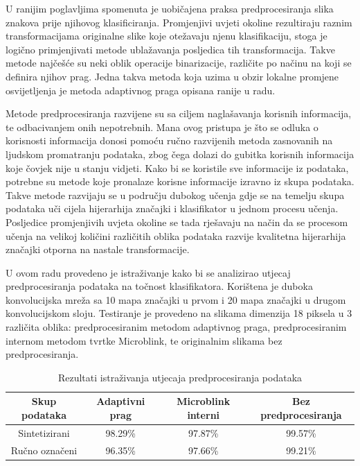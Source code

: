 \documentclass[lmodern, utf8, diplomski, numeric]{fer}
\begin{document}
U ranijim poglavljima spomenuta je uobičajena praksa predprocesiranja slika znakova prije njihovog klasificiranja. Promjenjivi uvjeti okoline rezultiraju raznim transformacijama originalne slike koje otežavaju njenu klasifikaciju, stoga je logično primjenjivati metode ublažavanja posljedica tih transformacija. Takve metode najčešće su neki oblik operacije binarizacije, različite po načinu na koji se definira njihov prag. Jedna takva metoda koja uzima u obzir lokalne promjene osvijetljenja je metoda adaptivnog praga opisana ranije u radu.

Metode predprocesiranja razvijene su sa ciljem naglašavanja korisnih informacija, te odbacivanjem onih nepotrebnih. Mana ovog pristupa je što se odluka o korisnosti informacija donosi pomoću ručno razvijenih metoda zasnovanih na ljudskom promatranju podataka, zbog čega dolazi do gubitka korisnih informacija koje čovjek nije u stanju vidjeti. Kako bi se koristile sve informacije iz podataka, potrebne su metode koje pronalaze korisne informacije izravno iz skupa podataka. Takve metode razvijaju se u području dubokog učenja gdje se na temelju skupa podataka uči cijela hijerarhija značajki i klasifikator u jednom procesu učenja. Posljedice promjenjivih uvjeta okoline se tada rješavaju na način da se procesom učenja na velikoj količini različitih oblika podataka razvije kvalitetna hijerarhija značajki otporna na nastale transformacije.

U ovom radu provedeno je istraživanje kako bi se analizirao utjecaj predprocesiranja podataka na točnost klasifikatora. Korištena je duboka konvolucijska mreža sa 10 mapa značajki u prvom i 20 mapa značajki u drugom konvolucijskom sloju. Testiranje je provedeno na slikama dimenzija 18 piksela u 3 različita oblika: predprocesiranim metodom adaptivnog praga, predprocesiranim internom metodom tvrtke Microblink, te originalnim slikama bez predprocesiranja.
 
\hspace{2em}
\begin{table}[ht!]
\begin{center}
\centering
    \begin{tabular}{ | c| c| c|c |}
    \hline
    Skup podataka & Adaptivni prag & Microblink interni & Bez predprocesiranja \\ \hline
    Sintetizirani & 98.29\% & 97.87\%  & 99.57\% \\ \hline
    Ručno označeni & 96.35\% & 97.66\% & 99.21\% \\  
    \hline
    \end{tabular}
\end{center}
\caption{Rezultati istraživanja utjecaja predprocesiranja podataka}
\label{tab:preproc}
\end{table}
\end{document}
